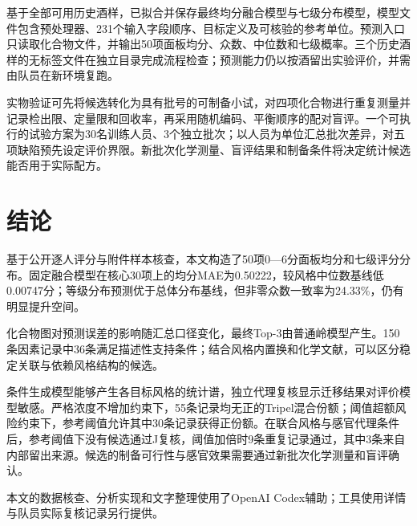 \documentclass{mathorcup-journal}
\begin{document}
基于全部可用历史酒样，已拟合并保存最终均分融合模型与七级分布模型，模型文件包含预处理器、231个输入字段顺序、目标定义及可核验的参考单位。预测入口只读取化合物文件，并输出50项面板均分、众数、中位数和七级概率。三个历史酒样的无标签文件在独立目录完成流程检查；预测能力仍以按酒留出实验评价，并需由队员在新环境复跑。


实物验证可先将候选转化为具有批号的可制备小试，对四项化合物进行重复测量并记录检出限、定量限和回收率，再采用随机编码、平衡顺序的配对盲评。一个可执行的试验方案为30名训练人员、3个独立批次；以人员为单位汇总批次差异，对五项缺陷预先设定评价界限。新批次化学测量、盲评结果和制备条件将决定统计候选能否用于实际配方。


\section{结论}

基于公开逐人评分与附件样本核查，本文构造了50项0—6分面板均分和七级评分分布。固定融合模型在核心30项上的均分MAE为0.50222，较风格中位数基线低0.00747分；等级分布预测优于总体分布基线，但非零众数一致率为24.33\%，仍有明显提升空间。


化合物图对预测误差的影响随汇总口径变化，最终Top-3由普通岭模型产生。150条因素记录中36条满足描述性支持条件；结合风格内置换和化学文献，可以区分稳定关联与依赖风格结构的候选。


条件生成模型能够产生各目标风格的统计谱，独立代理复核显示迁移结果对评价模型敏感。严格浓度不增加约束下，55条记录均无正的Tripel混合份额；阈值超额风险约束下，参考阈值允许其中30条记录获得正份额。在联合风格与感官代理条件后，参考阈值下没有候选通过J复核，阈值加倍时9条重复记录通过，其中3条来自内部留出来源。候选的制备可行性与感官效果需要通过新批次化学测量和盲评确认。


本文的数据核查、分析实现和文字整理使用了OpenAI Codex辅助；工具使用详情与队员实际复核记录另行提供。
\end{document}
